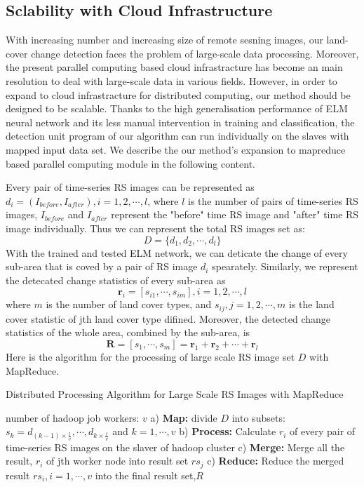 \documentclass{elsart}
\begin{document}
\subsection{Sclability with Cloud Infrastructure}

With increasing number and increasing size of remote sesning images, our land-cover change detection faces the problem of large-scale data processing.
Moreover, the present parallel computing based cloud infrastracture has become an main resolution to deal with large-scale data in various fields.
However, in order to expand to cloud infrastracture for distributed computing, our method should be designed to be scalable.
Thanks to the high generalisation performance of ELM neural network and its less manual intervention in training and classification, the detection unit program of our algorithm can run individually on the slaves with mapped input data set.
We describe the our method's expansion to mapreduce based parallel computing module in the following content.
\par
Every pair of time-series RS images can be represented as $d_i = (I_{before},I_{after}), i=1,2,\cdots,l$, where $l$ is the number of pairs of time-series RS images, $I_{before}$ and ${I_{after}}$ represent the "before" time RS image and "after" time RS image individually.
Thus we can represent the total RS images set as:
$$
	D = \{ d_1,d_2,\cdots,d_l \}
$$
With the trained and tested ELM network, we can deticate the change of every sub-area that is coved by a pair of RS image $d_i$ spearately. 
Similarly, we represent the detecated change statistics of every sub-area as 
$$\mathbf{r}_i=\left[s_{i1},\cdots,s_{im} \right], i=1,2,\cdots,l$$
where $m$ is the number of land cover types, and $s_{ij},j=1,2,\cdots,m$ is the land cover statistic of jth land cover type difined. 
Moreover, the detected change statistics of the whole area, combined by the sub-area, is 
$$
	\mathbf{R} = \left[s_{1},\cdots,s_{m} \right] 
		   = \mathbf{r}_1 + \mathbf{r}_2 + \cdots + \mathbf{r}_l
$$
Here is the algorithm for the processing of large scale RS image set $D$ with MapReduce.
\begin{algorithm}
\caption{Distributed Processing Algorithm for Large Scale RS Images with MapReduce}
\label{alg2}
\begin{algorithmic}
\REQUIRE number of hadoop job workers: $v$ 
\STATE a) \textbf{Map:} divide $D$ into subsets: $s_k={d_{(k-1) \times \tfrac{l}{v}}, \cdots, d_{k \times \tfrac{l}{v}}}$ and $k=1,\cdots,v$
\STATE b) \textbf{Process:} Calculate $r_i$ of every pair of time-series RS images on the slaver of hadoop cluster
\STATE c) \textbf{Merge:} Merge all the result, $r_i$ of jth worker node into result set $rs_j$
\STATE c) \textbf{Reduce:} Reduce the merged result $rs_i,i=1,\cdots,v$ into the final result set,$R$
\end{algorithmic}
\end{algorithm}
\end{document}
